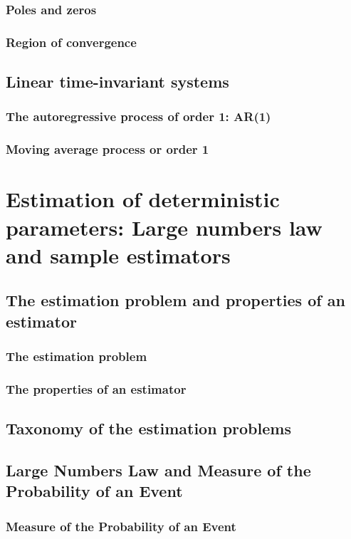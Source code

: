 \subsubsection{Poles and zeros}
\subsubsection{Region of convergence}
\subsection{Linear time-invariant systems}
\subsubsection{The autoregressive process of order 1: AR(1)}
\subsubsection{Moving average process or order 1}

\section{Estimation of deterministic parameters: Large numbers law and sample estimators}
\subsection{The estimation problem and properties of an estimator}
\subsubsection{The estimation problem}
\subsubsection{The properties of an estimator}
\subsection{Taxonomy of the estimation problems}
\subsection{Large Numbers Law and Measure of the Probability of an Event}
\subsubsection{Measure of the Probability of an Event}
